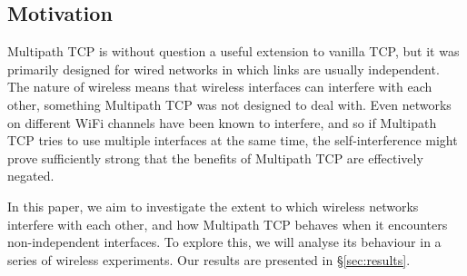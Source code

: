 \subsection{Motivation}
\label{sec:bg:motivation}
Multipath TCP is without question a useful extension to vanilla TCP, but it was
primarily designed for wired networks in which links are usually independent.
The nature of wireless means that wireless interfaces can interfere with each
other, something Multipath TCP was not designed to deal with. Even networks on
different WiFi channels have been known to interfere, and so if Multipath TCP
tries to use multiple interfaces at the same time, the self-interference might
prove sufficiently strong that the benefits of Multipath TCP are effectively
negated.

In this paper, we aim to investigate the extent to which wireless networks
interfere with each other, and how Multipath TCP behaves when it encounters
non-independent interfaces. To explore this, we will analyse its behaviour in a
series of wireless experiments. Our results are presented in
\S\ref{sec:results}.
